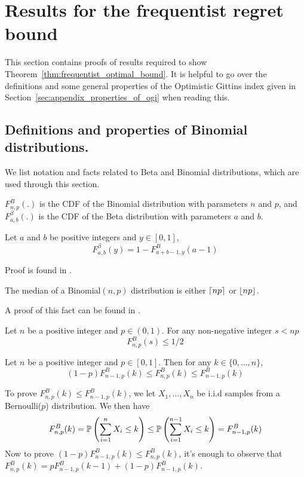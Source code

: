 \section{Results for the frequentist regret bound}
This section contains proofs of results required to show Theorem~\ref{thm:frequentist_optimal_bound}. It is helpful to go over the definitions and some general properties of the Optimistic Gittins index given in Section~\ref{sec:appendix_properties_of_ogi} when reading this.
\subsection{Definitions and properties of Binomial distributions.}
We list notation and facts related to Beta and Binomial distributions, which are used through this section.
\begin{definition}
	$F^B_{n,p}(.)$ is the CDF of the Binomial distribution with parameters $n$ and $p$, and $F^\beta_{a,b}(.)$ is the CDF of the Beta distribution with parameters $a$ and $b$.
\end{definition}

\begin{lemma} \label{fact:equation_for_beta_binomial_cdfs}
	Let $a$ and $b$ be positive integers and $y \in [0,1]$, 
	\[
	F^\beta_{a,b}(y) = 1 - F^B_{a+b-1,y}(a-1)
	\]
\end{lemma}
\begin{myproof}[Proof.]
	Proof is found in \cite{agrawalanalysis}.
\end{myproof}
\begin{lemma} \label{fact:median_of_binomial_dist}
	The median of a Binomial$(n,p)$ distribution is either $\ceil{np}$ or $\floor{np}$.
\end{lemma}
\begin{myproof}[Proof]
	A proof of this fact can be found in \cite{jogdeo1968monotone}.
\end{myproof}

\begin{corollary} \label{cor:corollarly_of_binomial_median_property}
	Let $n$ be a positive integer and $p \in (0,1)$. For any non-negative integer $s < np$
	\[
	F^B_{n,p}(s) \le 1/2
	\]
\end{corollary}

\begin{lemma} \label{fact:relationship_with_binom_cdfs}
	Let $n$ be a positive integer and $p \in [0,1]$. Then for any $k \in \{0,\ldots,n\}$,
	\[
	(1-p)F^B_{n-1,p}(k)\le F^B_{n,p}(k) \le F^B_{n-1,p}(k)
	\] 
\end{lemma}
\begin{myproof}[Proof]
	To prove $F^B_{n,p}(k) \le F^B_{n-1,p}(k)$, we let $X_1,\ldots,X_{n}$ be i.i.d samples from a Bernoulli($p$) distribution. We then have
	\begin{align*}
	F^B_{n,p}(k)  = \P{\sum_{i=1}^{n} X_i \le k}  \le  \P{\sum_{i=1}^{n-1} X_i \le k}  = F^B_{n-1,p}(k)
	\end{align*}
	Now to prove $(1-p)F^B_{n-1,p}(k)\le F^B_{n,p}(k)$, it's enough to observe that $F^B_{n,p}(k) = p F^B_{n-1,p}(k-1) + (1-p) F^B_{n-1,p}(k)$.
\end{myproof}

